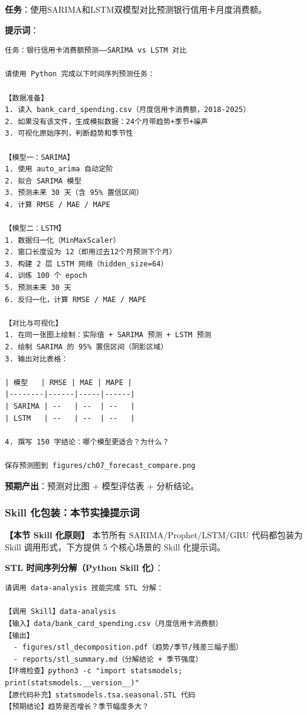 \begin{practicebox}[实操：银行信用卡消费额预测]
\textbf{任务}：使用SARIMA和LSTM双模型对比预测银行信用卡月度消费额。

\textbf{提示词}：

\begin{lstlisting}
任务：银行信用卡消费额预测——SARIMA vs LSTM 对比

请使用 Python 完成以下时间序列预测任务：

【数据准备】
1. 读入 bank_card_spending.csv（月度信用卡消费额，2018-2025）
2. 如果没有该文件，生成模拟数据：24个月带趋势+季节+噪声
3. 可视化原始序列，判断趋势和季节性

【模型一：SARIMA】
1. 使用 auto_arima 自动定阶
2. 拟合 SARIMA 模型
3. 预测未来 30 天（含 95% 置信区间）
4. 计算 RMSE / MAE / MAPE

【模型二：LSTM】
1. 数据归一化（MinMaxScaler）
2. 窗口长度设为 12（即用过去12个月预测下个月）
3. 构建 2 层 LSTM 网络（hidden_size=64）
4. 训练 100 个 epoch
5. 预测未来 30 天
6. 反归一化，计算 RMSE / MAE / MAPE

【对比与可视化】
1. 在同一张图上绘制：实际值 + SARIMA 预测 + LSTM 预测
2. 绘制 SARIMA 的 95% 置信区间（阴影区域）
3. 输出对比表格：

| 模型   | RMSE | MAE | MAPE |
|--------|------|-----|------|
| SARIMA | --   | --  | --   |
| LSTM   | --   | --  | --   |

4. 撰写 150 字结论：哪个模型更适合？为什么？

保存预测图到 figures/ch07_forecast_compare.png
\end{lstlisting}

\textbf{预期产出}：预测对比图 + 模型评估表 + 分析结论。
\end{practicebox}

\subsubsection{Skill 化包装：本节实操提示词}

\textbf{【本节 Skill 化原则】} 本节所有 SARIMA/Prophet/LSTM/GRU 代码都包装为 Skill 调用形式，下方提供 5 个核心场景的 Skill 化提示词。

\textbf{STL 时间序列分解（Python Skill 化）}：
\begin{lstlisting}
请调用 data-analysis 技能完成 STL 分解：

【调用 Skill】data-analysis
【输入】data/bank_card_spending.csv（月度信用卡消费额）
【输出】
  - figures/stl_decomposition.pdf（趋势/季节/残差三幅子图）
  - reports/stl_summary.md（分解结论 + 季节强度）
【环境检查】python3 -c "import statsmodels; print(statsmodels.__version__)"
【原代码补充】statsmodels.tsa.seasonal.STL 代码
【预期结论】趋势是否增长？季节幅度多大？
\end{lstlisting}

